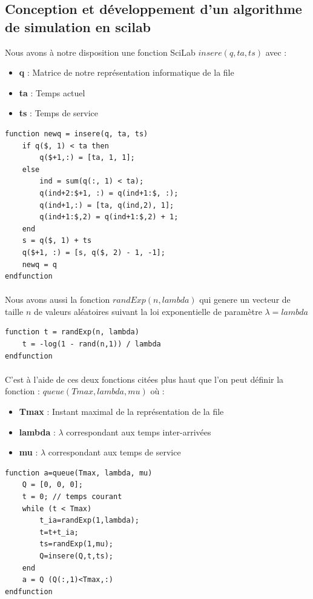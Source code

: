\documentclass{article}
\begin{document}
\subsection{Conception et développement d'un algorithme de simulation en scilab}
Nous avons à notre disposition une fonction SciLab $insere(q, ta, ts)$ avec :
\begin{itemize}
	\item \textbf{q} : Matrice de notre représentation informatique de la file
	\item \textbf{ta} : Temps actuel
	\item \textbf{ts} : Temps de service
\end{itemize}
\begin{verbatim}
function newq = insere(q, ta, ts)
    if q($, 1) < ta then 
        q($+1,:) = [ta, 1, 1];
    else
        ind = sum(q(:, 1) < ta);
        q(ind+2:$+1, :) = q(ind+1:$, :);
        q(ind+1,:) = [ta, q(ind,2), 1];
        q(ind+1:$,2) = q(ind+1:$,2) + 1;
    end
    s = q($, 1) + ts 
    q($+1, :) = [s, q($, 2) - 1, -1];
    newq = q
endfunction
\end{verbatim}
\paragraph{}
Nous avons aussi la fonction $randExp(n,lambda)$ qui genere un vecteur de taille $n$ de valeurs aléatoires suivant la loi exponentielle de paramètre $\lambda=lambda$
\begin{verbatim}
function t = randExp(n, lambda)
    t = -log(1 - rand(n,1)) / lambda
endfunction
\end{verbatim}

\paragraph{}
C'est à l'aide de ces deux fonctions citées plus haut que l'on peut définir la fonction : $queue(Tmax, lambda, mu)$ où :
\begin{itemize}
	\item \textbf{Tmax} : Instant maximal de la représentation de la file
	\item \textbf{lambda} : $\lambda$ correspondant aux temps inter-arrivées
	\item \textbf{mu} :  $\lambda$ correspondant aux temps de service
\end{itemize}
\begin{verbatim}
function a=queue(Tmax, lambda, mu)
    Q = [0, 0, 0];
    t = 0; // temps courant
    while (t < Tmax)
        t_ia=randExp(1,lambda);
        t=t+t_ia;
        ts=randExp(1,mu);
        Q=insere(Q,t,ts);
    end
    a = Q (Q(:,1)<Tmax,:)
endfunction
\end{verbatim}
\end{document}
